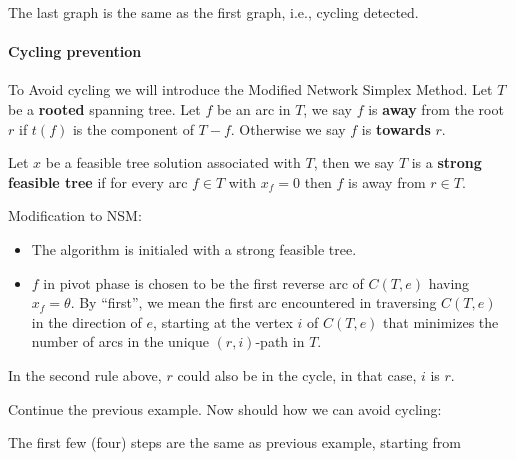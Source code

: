                 The last graph is the same as the first graph, i.e., cycling detected.

            \paragraph{Cycling prevention}
                To Avoid cycling we will introduce the Modified Network Simplex Method. Let $T$ be a \textbf{rooted} spanning tree. Let $f$ be an arc in $T$, we say $f$ is \textbf{away} from the root $r$ if $t(f)$ is the component of $T-f$. Otherwise we say $f$ is \textbf{towards} $r$.

                Let $x$ be a feasible tree solution associated with $T$, then we say $T$ is a \textbf{strong feasible tree} if for every arc $f \in T$ with $x_f = 0$ then $f$ is away from $r\in T$.

                Modification to NSM:
                \begin{itemize}
                    \item The algorithm is initialed with a strong feasible tree.
                    \item $f$ in pivot phase is chosen to be the first reverse arc of $C(T, e)$ having $x_f = \theta$. By ``first'', we mean the first arc encountered in traversing $C(T, e)$ in the direction of $e$, starting at the vertex $i$ of $C(T, e)$ that minimizes the number of arcs in the unique $(r, i)$-path in $T$.
                \end{itemize}

                In the second rule above, $r$ could also be in the cycle, in that case, $i$ is $r$.

                Continue the previous example. Now should how we can avoid cycling:

                The first few (four) steps are the same as previous example, starting from

                \begin{figure}[H]
                    \centering
                \end{figure}

